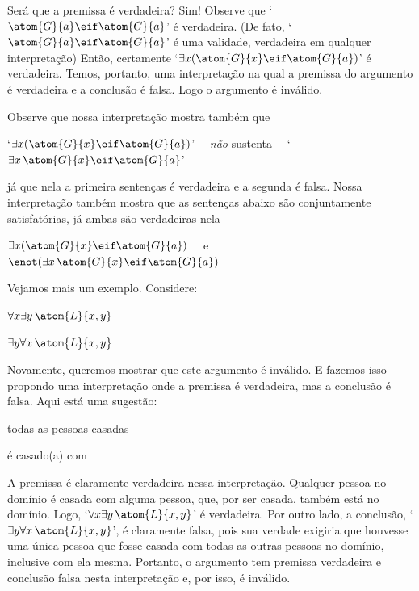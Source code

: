 Será que a premissa é verdadeira?
Sim!
Observe que `$\atom{G}{a} \eif \atom{G}{a}$' é verdadeira. (De fato, `$\atom{G}{a} \eif \atom{G}{a}$' é uma validade, verdadeira em qualquer interpretação)
Então, certamente `$\exists x (\atom{G}{x} \eif \atom{G}{a})$' é verdadeira.
Temos, portanto, uma interpretação na qual a premissa do argumento é verdadeira e a conclusão é falsa.
Logo o argumento é inválido. 

Observe que nossa interpretação mostra também que
\begin{center}
	`$\exists x(\atom{G}{x} \eif \atom{G}{a})$' \ \ \emph{não} sustenta \ \ `$\exists x\, \atom{G}{x} \eif \atom{G}{a}$'
\end{center}
já que nela a primeira sentenças é verdadeira e a segunda é falsa.
Nossa interpretação também mostra que as sentenças abaixo são conjuntamente satisfatórias, já ambas são verdadeiras nela
\begin{center}
	$\exists x (\atom{G}{x} \eif \atom{G}{a})$ \ \ e \ \ $\enot (\exists x\, \atom{G}{x} \eif \atom{G}{a})$
\end{center}

Vejamos mais um exemplo.
Considere:
\begin{earg}
	\item[] $\forall x \exists y\, \atom{L}{x,y}$
	\item[\therefore ] $\exists y \forall x\, \atom{L}{x,y}$
\end{earg}

Novamente, queremos mostrar que este argumento é inválido.
E fazemos isso propondo uma interpretação onde a premissa é verdadeira, mas a conclusão é falsa.
Aqui está uma sugestão:
	\begin{center}
	\begin{ekey}
		\item[\text{domínio}] todas as pessoas casadas
		\item[\atom{L}{x,y}]  é casado(a) com 
	\end{ekey}
	\end{center}
A premissa é claramente verdadeira nessa interpretação. Qualquer pessoa no domínio é casada com alguma pessoa, que, por ser casada, também está no domínio.
Logo, `$\forall x \exists y\, \atom{L}{x,y}$' é verdadeira.
Por outro lado, a conclusão, `$\exists y \forall x\, \atom{L}{x,y}$',  é claramente falsa, pois sua verdade exigiria que houvesse uma única pessoa que fosse casada com todas as outras pessoas no domínio, inclusive com ela mesma.
Portanto, o argumento tem premissa verdadeira e conclusão falsa nesta interpretação e, por isso, é inválido.

